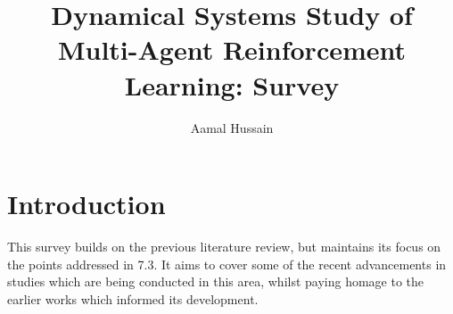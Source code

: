 \documentclass{article}
\title{Dynamical Systems Study of Multi-Agent Reinforcement Learning: Survey}
\author{Aamal Hussain}
\begin{document}
    \section{Introduction}

    This survey builds on the previous literature review, but maintains its focus on the points
    addressed in 7.3. It aims to cover some of the recent advancements in studies which are being
    conducted in this area, whilst paying homage to the earlier works which informed its
    development. 
\end{document}
